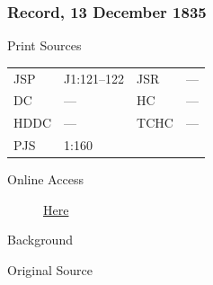 		\subsubsection{Record, 13 December 1835}
			\label{EMS-1835-JS-13-DEC-1835}
			
			\begin{description}
				\item[Print Sources]
			\end{description}

				\begin{tabular}{p{0.5in}p{1in}p{0.5in}p{1in}}
				JSP	 	& J1:121--122		& JSR 		& --- \\
				DC	 	& --- 				& HC 		& --- \\
				HDDC 	& ---				& TCHC 		& --- \\
				PJS 	& 1:160			& 	 		&  \\
				\end{tabular}
			
			\begin{description}
				\item[Online Access] \href{https://www.josephsmithpapers.org/paper-summary/journal-1835-1836/66}{Here}
			\end{description}
			
			\begin{description}
				\item[Background]
			\end{description}
			
			
			\begin{description}
				\item[Original Source]
			\end{description}
			
			
